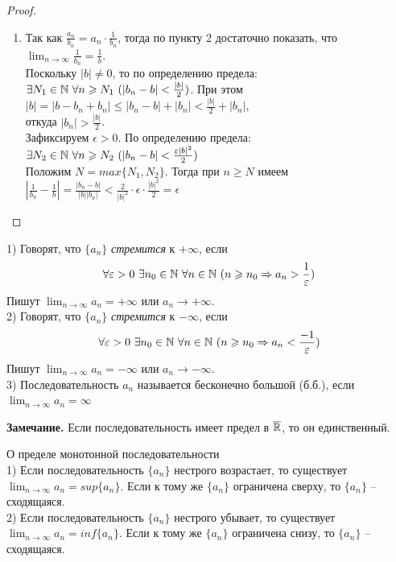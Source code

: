 \begin{proof}
\begin{enumerate}
        \item Так как $\frac{a_{n}}{b_{n}} = a_{n} \cdot \frac{1}{b_{n}}$, тогда по пункту 2 достаточно показать, что $\lim_{n \to \infty} \frac{1}{b_{n}} = \frac{1}{b}$.\\
            Поскольку $|b| \neq 0$, то по определению предела:\\
            $\exists N_1 \in \N \ \forall n \geq N_1 \ (|b_{n} - b| < \frac{|b|}{2})$. При этом $|b| = |b - b_{n} + b_{n}| \leq |b_{n} - b| + |b_{n}| < \frac{|b|}{2} + |b_{n}|$,\\
            откуда $|b_{n}| > \frac{|b|}{2}$.\\
            Зафиксируем $\epsilon > 0$. По определению предела:\\
            $\exists N_2 \in \N \ \forall n \geq N_2 \ (|b_{n} - b| < \frac{\epsilon|b|^2}{2})$\\
            Положим $N = max\{N_1, N_2\}$. Тогда при $n \geq N$ имеем $|\frac{1}{b_{n}} - \frac{1}{b}| = \frac{|b_{n} - b|}{|b||b_{n}|} < \frac{2}{|b|^2} \cdot \epsilon \cdot \frac{|b|^2}{2} = \epsilon$
        \end{enumerate}
    \end{proof}

    \begin{definition}
        1) Говорят, что $\{a_{n}\}$ \textit{стремится} к $+ \infty$, если 
        \[\forall \varepsilon > 0 \  \exists n_{0} \in \mathbb{N} \ \forall n \in \mathbb{N} \ (n \geqslant n_{0} \Rightarrow a_{n} > \frac{1}{\varepsilon})\]
        Пишут $\lim_{n \to \infty} a_{n} = + \infty$ или $ a_{n} \rightarrow + \infty$.
        \\
        2) Говорят, что $\{a_{n}\}$ \textit{стремится} к $- \infty$, если 
        \[\forall \varepsilon > 0 \  \exists n_{0} \in \mathbb{N} \ \forall n \in \mathbb{N} \ (n \geqslant n_{0} \Rightarrow a_{n} < \frac{-1}{\varepsilon})\]
        Пишут $\lim_{n \to \infty} a_{n} = - \infty$ или $ a_{n} \rightarrow - \infty$.
        \\
        3) Последовательность $a_{n}$ называется бесконечно большой (б.б.), если $\lim_{n \to \infty} a_{n} = \infty$
    \end{definition}
    
    \textbf{Замечание.} Если последовательность имеет предел в $\overline{\mathbb{R}}$, то он единственный.

    \begin{theorem}{О пределе монотонной последовательности}
        \\
        1) Если последовательность $\{a_{n}\}$ нестрого возрастает, то существует $\lim_{n \to \infty} a_{n} = sup\{a_{n}\}$. Если к тому же $\{a_{n}\}$ ограничена сверху, то $\{a_{n}\}$ -- сходящаяся.
        \\
        2) Если последовательность $\{a_{n}\}$ нестрого убывает, то существует $\lim_{n \to \infty} a_{n} = inf\{a_{n}\}$. Если к тому же $\{a_{n}\}$ ограничена снизу, то $\{a_{n}\}$ -- сходящаяся.
    \end{theorem}
    
